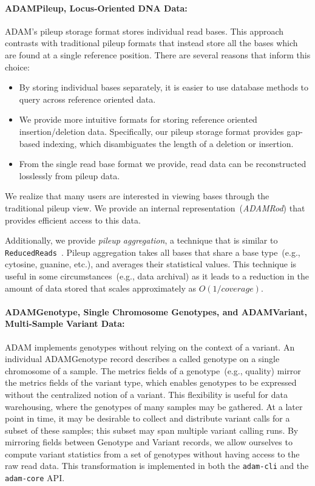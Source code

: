 \documentclass{bioinfo}
\begin{document}
\paragraph{ADAMPileup, Locus-Oriented DNA Data:}
\label{sec:adampileup}

ADAM's pileup storage format stores individual read bases. This approach contrasts with traditional pileup formats that instead store all the bases which are found at a single
reference position. There are several reasons that inform this choice:

\begin{itemize}
\item By storing individual bases separately, it is easier to use database methods to query across reference oriented data.
\item We provide more intuitive formats for storing reference oriented insertion/deletion data. Specifically, our pileup storage format provides gap-based indexing, which
disambiguates the length of a deletion or insertion.
\item From the single read base format we provide, read data can be reconstructed losslessly from pileup data.
\end{itemize}

We realize that many users are interested in viewing bases through the traditional pileup view. We provide an internal representation~(\textit{ADAMRod}) that provides
efficient access to this data.


Additionally, we provide \emph{pileup aggregation}, a technique that is similar to \texttt{ReducedReads}~\citep[see][]{mckenna10}. Pileup aggregation takes all bases that
share a base type~(e.g., cytosine, guanine, etc.), and averages their statistical values. This technique is useful in some circumstances~(e.g., data archival) as it leads to a
reduction in the amount of data stored that scales approximately as $O(1/coverage)$.

\paragraph{ADAMGenotype, Single Chromosome Genotypes, and ADAMVariant, Multi-Sample Variant Data:}
\label{sec:adamvariant}

ADAM implements genotypes without relying on the context of a variant. An individual ADAMGenotype record describes a called genotype on a single chromosome of a
sample. The metrics fields of a genotype~(e.g., quality) mirror the metrics fields of the variant type, which enables genotypes to be expressed without the centralized notion
of a variant. This flexibility is useful for data warehousing, where the genotypes of many samples may be gathered. At a later point in time, it may be desirable to collect and distribute
variant calls for a subset of these samples; this subset may span multiple variant calling runs. By mirroring fields between Genotype and Variant records, we allow ourselves
to compute variant statistics from a set of genotypes without having access to the raw read data. This transformation is implemented in both the \texttt{adam-cli} and the
\texttt{adam-core} API.
\end{document}
